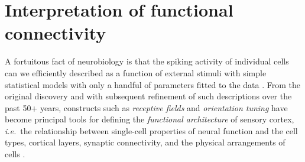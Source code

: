 \section{Interpretation of functional connectivity}
A fortuitous fact of neurobiology is that the spiking activity of individual cells can we efficiently described as a function of external stimuli with simple statistical models with only a handful of parameters fitted to the data \citep{Carandini:2005}. From the original discovery and with subsequent refinement of such descriptions over the past 50+ years, constructs such as \emph{receptive fields} and \emph{orientation tuning} have become principal tools for defining the \emph{functional architecture} of sensory cortex, \emph{i.e.}\ the relationship between single-cell properties of neural function and the cell types, cortical layers, synaptic connectivity, and the physical arrangements of cells  \citep{Hubel:1962,Ohki:2005,Reid:2012}.
